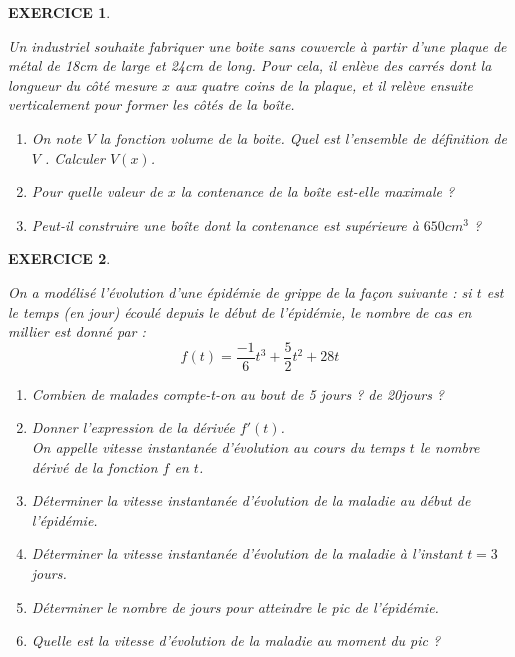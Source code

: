 \documentclass[a4paper]{article}   %
\renewcommand{\(}{\left(}
\renewcommand{\)}{\right)}
\newtheorem{EXO}{\large EXERCICE }
\newenvironment{EX}   { \setcounter{ques}{0} \begin{EXO} \hrulefill ~\vspace{0.3cm}

\normalfont}    {\end{EXO} \medskip}
\newcommand{\f}{\dfrac} 	%
\begin{document}
\begin{EX} Un industriel souhaite fabriquer une boite sans couvercle à partir d'une plaque de métal de 18cm de large et 24cm de long. Pour cela, il enlève des carrés dont la longueur du côté mesure $x$ aux quatre coins de la plaque, et il relève ensuite verticalement pour former les côtés de la boîte. 
\begin{enumerate}
\item On note $V$ la fonction volume de la boite. Quel est l'ensemble de définition de $V$ . Calculer $V(x)$.
\item Pour quelle valeur de $x$ la contenance de la boîte est-elle maximale ?
\item Peut-il construire une boîte dont la contenance est supérieure à $650 cm^3$ ?
\end{enumerate}

\end{EX}

\begin{EX}
On a modélisé l'évolution d'une épidémie de grippe de la façon suivante : si $t$ est le temps (en jour) écoulé depuis le début de l'épidémie, le nombre de cas en millier est donné par : 
$$f(t)=\f{-1}{6}t^3+\f{5}{2}t^2+28t$$
\begin{enumerate}
\item Combien de malades compte-t-on au bout de 5 jours ? de 20jours ?
\item Donner l'expression de la dérivée $f'(t)$. \\
On appelle vitesse instantanée d'évolution au cours du temps $t$ le nombre dérivé de la fonction $f$ en $t$.
\item Déterminer la vitesse instantanée d'évolution de la maladie au début de l'épidémie.
\item Déterminer la vitesse instantanée d'évolution de la maladie à l'instant $t=3$ jours.
\item Déterminer le nombre de jours pour atteindre le pic de l'épidémie.
\item Quelle est la vitesse d'évolution de la maladie au moment du pic ?
\end{enumerate}

\end{EX}
\end{document}
